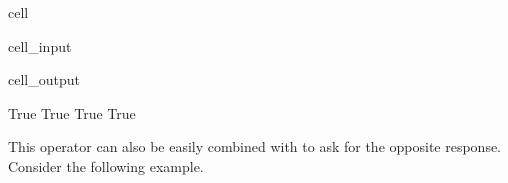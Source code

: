 \documentclass[letterpaper,10pt,english]{jupyterBook}
\begin{document}
\begin{sphinxuseclass}{cell}\begin{sphinxVerbatimInput}

\begin{sphinxuseclass}{cell_input}
\begin{sphinxVerbatim}[commandchars=\\\{\}]
  \PYG{p}{[}   \PYG{p}{]}
  
  
  
     
  
\end{sphinxVerbatim}

\end{sphinxuseclass}\end{sphinxVerbatimInput}
\begin{sphinxVerbatimOutput}

\begin{sphinxuseclass}{cell_output}
\begin{sphinxVerbatim}[commandchars=\\\{\}]
True
True
True
True
\end{sphinxVerbatim}

\end{sphinxuseclass}\end{sphinxVerbatimOutput}

\end{sphinxuseclass}
\sphinxAtStartPar
This operator can also be easily combined with  to ask for the opposite response. Consider the following example.
\end{document}
